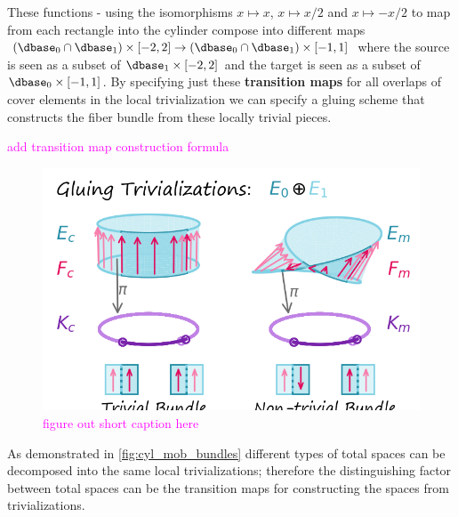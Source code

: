 \documentclass[journal]{IEEEtran}
\newcommand{\note}[1]{\textcolor{magenta}{#1}}
\theoremstyle{definition}
\theoremstyle{remark}
\begin{document}
These functions - using the isomorphisms $x\mapsto x$, $x\mapsto x/2$ and $x\mapsto -x/2$ to map from each rectangle into the cylinder compose into different maps $(\dbase_0\cap\dbase_1)\times[-2,2]\to(\dbase_0\cap\dbase_1)\times[-1,1]$ where the source is seen as a subset of $\dbase_1\times[-2,2]$ and the target is seen as a subset of $\dbase_0\times[-1,1]$. By specifying just these \textbf{transition maps} for all overlaps of cover elements in the local trivialization we can specify a gluing scheme that constructs the fiber bundle from these locally trivial pieces.


\note{add transition map construction formula} 

\begin{figure}[H]
  \includegraphics[width=1\columnwidth]{figures/cyl_mob.png}
  \caption{\note{figure out short caption here}\label{fig:cyl_mob_bundles}}
\end{figure}
As demonstrated in \autoref{fig:cyl_mob_bundles} different types of total spaces can be decomposed into the same local trivializations; therefore the distinguishing factor between total spaces can be the transition maps for constructing the spaces from trivializations. 
\end{document}
